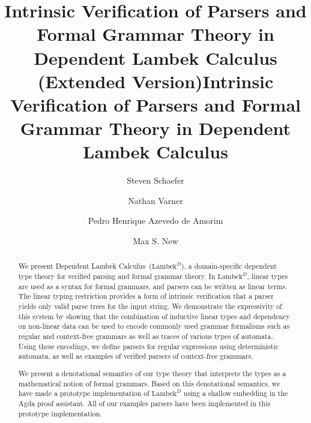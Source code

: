 \documentclass[acmsmall,nonacm]{acmart}
\newcommand{\theoryname}{Dependent Lambek Calculus\xspace}
\newcommand{\theoryabbv}{$\textrm{Lambek}^D$\xspace}
\begin{document}
\pagebreak

\ifarxiv
\title{Intrinsic Verification of Parsers and Formal Grammar Theory in Dependent
  Lambek Calculus (Extended Version)}
\else
\title{Intrinsic Verification of Parsers and Formal Grammar Theory in Dependent Lambek Calculus}
\fi

\author{Steven Schaefer}

\author{Nathan Varner}

\author{Pedro Henrique Azevedo de Amorim}

\author{Max S. New}

\makeatletter
\let\@authorsaddresses\@empty
\makeatother

\begin{abstract}
  We present \theoryname~(\theoryabbv), a domain-specific dependent
  type theory for verified parsing and formal grammar theory. In
  \theoryabbv, linear types are used as a syntax for formal grammars,
  and parsers can be written as linear terms. The linear typing
  restriction provides a form of intrinsic verification that a parser
  yields only valid parse trees for the input string. We demonstrate
  the expressivity of this system by showing that the combination of
  inductive linear types and dependency on non-linear data can be used
  to encode commonly used grammar formalisms such as regular and
  context-free grammars as well as traces of various types of
  automata. Using these encodings, we define parsers for regular
  expressions using deterministic automata, as well as
  examples of verified parsers of context-free grammars.

  We present a denotational semantics of our type theory that
  interprets the types as a mathematical notion of formal
  grammars. Based on this denotational semantics, we have made a
  prototype implementation of \theoryabbv using a shallow embedding in
  the Agda proof assistant. All of our examples parsers have been
  implemented in this prototype implementation.
\end{abstract}
\end{document}
